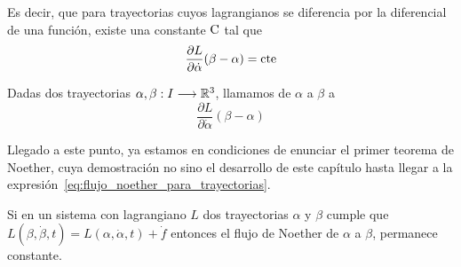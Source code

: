 Es decir, que para trayectorias cuyos lagrangianos se diferencia por la diferencial de una función, existe una constante $\text{\rmfamily\upshape C}$ tal que
\begin{equation}
	\label{eq:flujo_noether_para_trayectorias}
	\frac{\partial L}{\partial\dot{\alpha}}(\beta-\alpha) = \text{\rmfamily\upshape cte}
\end{equation}

\begin{definition}
	Dadas dos trayectorias $\alpha,\beta:I\longrightarrow \mathbb{R}^3$, llamamos  de $\alpha$ a $\beta$ a
	\begin{equation}
		\label{eq:flujo_noether}
		\frac{\partial L}{\partial\dot{\alpha}}(\beta-\alpha)
	\end{equation}
\end{definition}

Llegado a este punto, ya estamos en condiciones de enunciar el primer teorema de Noether, cuya demostración no sino el desarrollo de este capítulo hasta llegar a la expresión~\ref{eq:flujo_noether_para_trayectorias}.

\begin{theorem}
	\label{thm:noether}
	Si en un sistema con lagrangiano $L$ dos trayectorias $\alpha$ y $\beta$ cumple que $L(\beta, \dot{\beta}, t) = L(\alpha, \dot{\alpha}, t)+\dot{f}$ entonces el flujo de Noether de $\alpha$ a $\beta$, permanece constante.
\end{theorem}